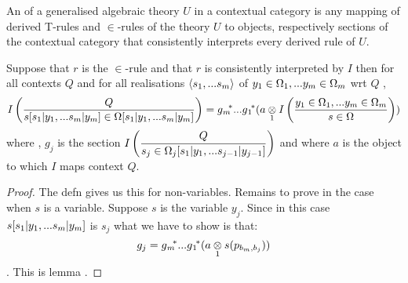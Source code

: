 \begin{definition}
An  of a generalised algebraic theory $U$ in a contextual category \catcw is  any mapping 
of derived T-rules and $\in$-rules of the theory $U$ to objects, respectively sections of the contextual category \catcw that
consistently interprets every derived rule of $U$.
\end{definition}

\begin{lemma}
Suppose that $r$ is the $\in$-rule \ZsOmega and that
$r$ is consistently interpreted by $I$ 
then
for all contexts $Q$ and for all realisations $\tuple{\sm}$ of $\yOmega{m}$ wrt $Q$  , 
$$ \Imappedrule{Q}{\ofT{s[\SUBsFORy{m}]}{\Omega[\SUBsFORy{m}]}} = \gmstar...\gonestar(\crossx{a}{\Imappedrule{\yOmega{m}}{\ofT{s}{\Omega}}}{1})$$
where \foreachj, $g_j$ is the section
$\displaystyle\Imappedrule{Q}{ \ofT{s_j}{\Omega_j[\SUBsFORy{j-1}]}}$
and where $a$ is the object to which $I$ maps context $Q$.
\end{lemma}
\begin{proof}
The defn gives us this for non-variables. Remains to prove in the case when $s$ is a variable. Suppose $s$ is the variable
$y_j$. Since in this case $s[\SUBsFORy{m}]$ is $s_j$ what we have to show is that:
$$g_j = \gmvectorstar(\crossx{a}{s(p_{b_m,b_j}}{1}))$$. This is lemma .
\end{proof}


